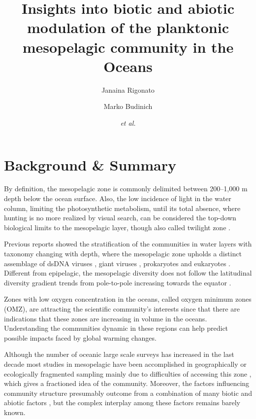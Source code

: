 \documentclass[fleqn,10pt]{wlscirep}
\title{Insights into biotic and abiotic modulation of the planktonic mesopelagic community in the Oceans}
\author[1,$\dag$]{Janaina Rigonato}
\author[2,$\dag$]{Marko Budinich}
\author[1,2]{\textit{et al.}}
\affil[$\dag$]{these authors contributed equally to this work}
\begin{document}
\flushbottom
\maketitle

\thispagestyle{empty}



\section*{Background \& Summary}

By definition, the mesopelagic zone is commonly delimited between 200–1,000 m depth below the ocean surface. Also, the low incidence of light in the water column, limiting the photosynthetic metabolism, until its total absence, where hunting is no more realized by visual search, can be considered the top-down biological limits to the mesopelagic layer, though also called twilight zone \cite{robinson_mesopelagic_2010}.

Previous reports showed the stratification of the communities in water layers with taxonomy changing with depth, where the mesopelagic zone upholds a distinct assemblage  of dsDNA viruses \cite{gregory_marine_2019}, giant viruses \cite{endo_biogeography_2020}, prokaryotes \cite{sunagawa_structure_2015,salazar_gene_2019} and eukaryotes \cite{giner_marked_2020}. Different from epipelagic, the mesopelagic diversity does not follow the latitudinal diversity gradient trends from pole-to-pole increasing towards the equator \cite{ibarbalz_global_2019}.

Zones with low oxygen concentration in the oceans, called oxygen minimum zones (OMZ), are attracting the scientific community's interests since that there are indications that these zones are increasing in volume in the oceans. Understanding the communities dynamic in these regions can help predict possible impacts faced by global warming changes.

Although the number of oceanic large scale surveys has increased in the last decade \cite{rusch_sorcerer_2007,karsenti_holistic_2011,pernice_global_2015} most studies in mesopelagic have been accomplished in geographically or ecologically fragmented sampling mainly due to difficulties of accessing this zone \cite{hidalgo_developing_2019}, which gives a fractioned idea of the community. Moreover, the factors influencing community structure presumably outcome from a combination of many biotic and abiotic factors \cite{lima-mendez_determinants_2015, louca_integrating_2016}, but the complex interplay among these factors remains barely known.
\end{document}
